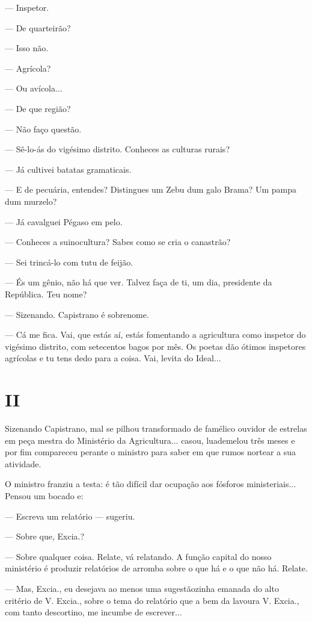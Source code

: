 --- Inspetor.

--- De quarteirão?

--- Isso não.

--- Agrícola?

--- Ou avícola...

--- De que região?

--- Não faço questão.

--- Sê-lo-ás do vigésimo distrito. Conheces as culturas rurais?

--- Já cultivei batatas gramaticais.

--- E de pecuária, entendes? Distingues um Zebu dum galo Brama? Um pampa
dum murzelo?

--- Já cavalguei Pégaso em pelo.

--- Conheces a suinocultura? Sabes como se cria o canastrão?

--- Sei trincá-lo com tutu de feijão.

--- És um gênio, não há que ver. Talvez faça de ti, um dia, presidente
da República. Teu nome?

--- Sizenando. Capistrano é sobrenome.

--- Cá me fica. Vai, que estás aí, estás fomentando a agricultura como
inspetor do vigésimo distrito, com setecentos bagos por mês. Os poetas
dão ótimos inspetores agrícolas e tu tens dedo para a coisa. Vai, levita
do Ideal...

\section{II}

Sizenando Capistrano, mal se pilhou transformado de famélico ouvidor de
estrelas em peça mestra do Ministério da Agricultura... casou,
luademelou três meses e por fim compareceu perante o ministro para saber
em que rumos nortear a sua atividade.

O ministro franziu a testa: é tão difícil dar ocupação aos fósforos
ministeriais... Pensou um bocado e:

--- Escreva um relatório --- sugeriu.

--- Sobre que, Excia.?

--- Sobre qualquer coisa. Relate, vá relatando. A função capital do
nosso ministério é produzir relatórios de arromba sobre o que há e o que
não há. Relate.

--- Mas, Excia., eu desejava ao menos uma sugestãozinha emanada do alto
critério de V. Excia., sobre o tema do relatório que a bem da lavoura V.
Excia., com tanto descortino, me incumbe de escrever...

